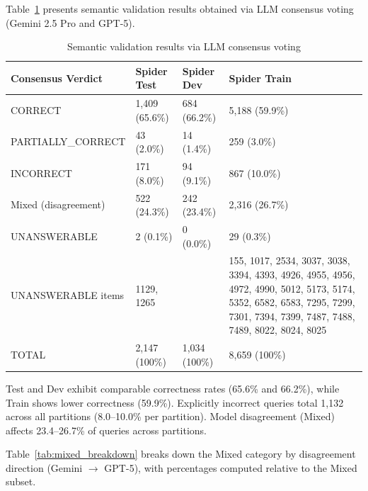 \documentclass[print]{einformatica}
\begin{document}
Table~\ref{tab:semantic} presents semantic validation results obtained via LLM consensus voting (Gemini 2.5 Pro and GPT-5).

\begin{table}[ht]
    \caption{Semantic validation results via LLM consensus voting}
    \label{tab:semantic}
    \centering
    \footnotesize
    \begin{tabular}{lp{}p{}p{}}
        \toprule
        \textbf{Consensus Verdict} & \textbf{Spider Test} & \textbf{Spider Dev} & \textbf{Spider Train} \\
        \midrule
        CORRECT & 1,409 (65.6\%) & 684 (66.2\%) & 5,188 (59.9\%) \\
        PARTIALLY\_CORRECT & 43 (2.0\%) & 14 (1.4\%) & 259 (3.0\%) \\
        INCORRECT & 171 (8.0\%) & 94 (9.1\%) & 867 (10.0\%) \\
        Mixed (disagreement) & 522 (24.3\%) & 242 (23.4\%) & 2,316 (26.7\%) \\
        UNANSWERABLE & 2 (0.1\%) & 0 (0.0\%) & 29 (0.3\%) \\
        UNANSWERABLE items & 1129, 1265 &  & 155, 1017, 2534, 3037, 3038, 3394, 4393, 4926, 4955, 4956, 4972, 4990, 5012, 5173, 5174, 5352, 6582, 6583, 7295, 7299, 7301, 7394, 7399, 7487, 7488, 7489, 8022, 8024, 8025 \\
        TOTAL & 2,147 (100\%) & 1,034 (100\%) & 8,659 (100\%) \\
        \bottomrule
    \end{tabular}
\end{table}

Test and Dev exhibit comparable correctness rates (65.6\% and 66.2\%), while Train shows lower correctness (59.9\%). Explicitly incorrect queries total 1,132 across all partitions (8.0--10.0\% per partition). Model disagreement (Mixed) affects 23.4--26.7\% of queries across partitions.

Table~\ref{tab:mixed_breakdown} breaks down the Mixed category by disagreement direction (Gemini $\rightarrow$ GPT-5), with percentages computed relative to the Mixed subset.
\end{document}
